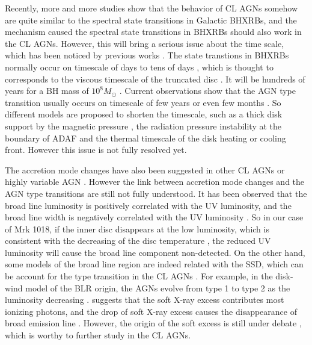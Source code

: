 \documentclass[twocolumn]{aastex63}
\begin{document}




 
Recently, more and more studies show that the behavior of CL AGNs somehow are quite similar to the spectral state transitions in Galactic BHXRBs, and the mechanism caused the spectral state transitions in BHXRBs should also work in the CL AGNs. However, this will bring a serious issue about the time scale, which has been noticed by previous works \citep[e.g. ][]{2018NatAs...2..102L,2018ApJ...864...27S,2018MNRAS.480.3898N,2020MNRAS.492.2335L}. The state transtions in BHXRBs normally occur on timescale of days to tens of days \citep{2009ApJ...701.1940Y,2010MNRAS.403...61D}, which is thought to corresponds to the viscous timescale of the truncated disc \citep[see reviews in ][]{2007A&ARv..15....1D}. It will be hundreds of years for a BH mass of $10^{8} M_{\odot}$ \citep[see detailed discussions in ][]{2018ApJ...864...27S,2020MNRAS.492.2335L}. Current observations show that the AGN type transition usually occurs on timescale of few years\citep{2016A&A...593L...8M,2018ApJ...864...27S,2019MNRAS.483L..88P,2020MNRAS.492.2335L} or even few months \citep{2019ApJ...883...94T}. So different models are proposed to shorten the timescale, such as a thick disk support by the magnetic pressure \citep{2019MNRAS.483L..17D}, the radiation pressure instability at the boundary of ADAF \citep{2019arXiv190406767S} and the thermal timescale of the disk heating or cooling front\citep{2018ApJ...864...27S}. However this issue is not fully resolved yet. 


The accretion mode changes have also been suggested in other CL AGNs or highly variable AGN \citep{2019arXiv191203972L,2020ApJ...890L..29A,2020MNRAS.492.2335L}. However the link between accretion mode changes and the AGN type transitions are still not fully understood. It has been observed that the broad line luminosity is positively correlated with the UV luminosity, and the broad line width is negatively correlated with the UV luminosity \citep{2019ApJ...885...44D}. So in our case of Mrk 1018, if the inner disc disappears at the low luminosity, which is consistent with the decreasing of the disc temperature \citep[see also ][]{2018MNRAS.480.3898N}, the reduced UV luminosity will cause the broad line component non-detected. On the other hand, some models of the broad line region are indeed related with the SSD, which can be account for the type transition in the CL AGNs \citep[see a recent review in ][]{ 2019OAst...28..200C}. For example, in the disk-wind model of the BLR origin, the AGNs evolve from type 1 to type 2 as the luminosity decreasing \citet{2014MNRAS.438.3340E}. \citet{2018MNRAS.480.3898N} suggests that the soft X-ray excess contributes most ionizing photons, and the drop of soft X-ray excess causes the disappearance of broad emission line \citep[see also in ][]{2020MNRAS.492.2335L}. However, the origin of the soft excess is still under debate \citep[e.g.][]{2018A&A...611A..59P}, which is worthy to further study in the CL AGNs. 
\end{document}
